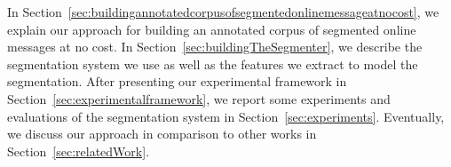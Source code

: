 %



In Section~\ref{sec:buildingannotatedcorpusofsegmentedonlinemessageatnocost}, we explain our approach for building an annotated corpus of segmented online messages at no cost. 
In Section~\ref{sec:buildingTheSegmenter}, we describe the segmentation system we use as well as the features we extract to model the segmentation. 
After presenting our experimental framework in Section~\ref{sec:experimentalframework}, we report some experiments and evaluations of the segmentation system in Section~\ref{sec:experiments}. 
Eventually, we discuss our approach in comparison to other works in Section~\ref{sec:relatedWork}.



